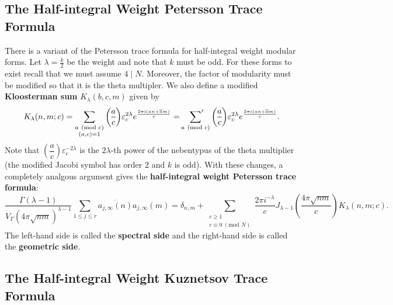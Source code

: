 \documentclass[12pt]{book}
\theoremstyle{definition}\newframedtheorem{method}{Method}
\newcommand{\psum}{\sideset{}{'}\sum}
\newcommand{\legendre}[2]{\genfrac{(}{)}{0.5pt}{0}{#1}{#2}}
\newcommand{\tmod}[1]{\ \left(\text{mod }#1\right)}
\renewcommand{\d}{\delta}
\renewcommand{\l}{\lambda}
\newcommand{\G}{\Gamma}
\newcommand{\e}{\varepsilon}
\newcommand{\<}{\langle}
\renewcommand{\>}{\rangle}
\newcommand{\conj}{\overline}
\begin{document}
    \subsection*{The Half-integral Weight Petersson Trace Formula}
      There is a variant of the Petersson trace formula for half-integral weight modular forms. Let $\l = \frac{k}{2}$ be the weight and note that $k$ must be odd. For these forms to exist recall that we must assume $4 \mid N$. Moreover, the factor of modularity must be modified so that it is the theta multipler. We also define a modified \textbf{Kloosterman sum} $K_{\l}(b,c,m)$ given by
      \[
        K_{\l}(n,m;c) = \sum_{\substack{a \tmod{c} \\ (a,c) = 1}}\legendre{a}{c}\e_{c}^{2\l}e^{\frac{2\pi i(an+\conj{a}m)}{c}} = \psum_{a \tmod{c}}\legendre{a}{c}\e_{c}^{2\l}e^{\frac{2\pi i(an+\conj{a}m)}{c}}.
      \]
      Note that $\legendre{a}{c}\e_{c}^{-2\l}$ is the $2\l$-th power of the nebentypus of the theta multiplier (the modified Jacobi symbol has order $2$ and $k$ is odd). With these changes, a completely analgous argument gives the \textbf{half-integral weight Petersson trace formula}:
      \[
        \frac{\G\left(\l-1\right)}{V_{\G}(4\pi\sqrt{nm})^{\l-1}}\sum_{1 \le j \le r}\conj{a_{j,\infty}(n)}a_{j,\infty}(m) = \d_{n,m}+\sum_{\substack{c \ge 1 \\ c \equiv 0 \tmod{N}}}\frac{2\pi i^{-\l}}{c}J_{\l-1}\left(\frac{4\pi\sqrt{nm}}{c}\right)K_{\l}(n,m;c).
      \]
      The left-hand side is called the \textbf{spectral side} and the right-hand side is called the \textbf{geometric side}.
    \subsection*{The Half-integral Weight Kuznetsov Trace Formula}
\appendix
\printindex


\end{document}
